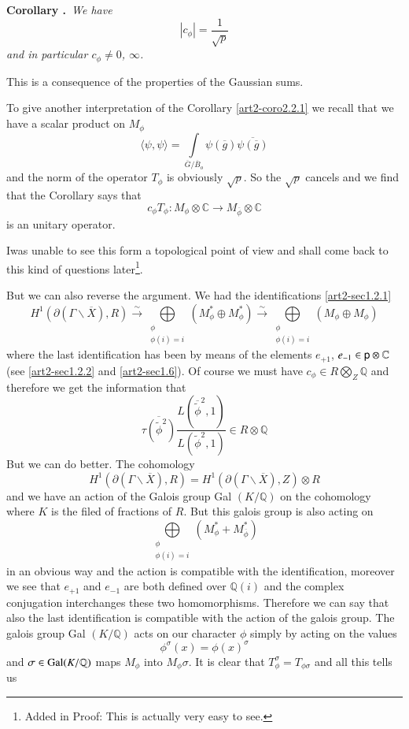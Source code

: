 \medskip
\noindent
{\bf Corollary .\label{art2-coro2.2.1}}~{\em We have}
$$
|c_{\phi}|=\frac{1}{\sqrt{p}}
$$
{\em and in particular $c_{\phi}\neq 0$, $\infty$.}
\smallskip

This is a consequence of the properties of the Gaussian sums.

To give another interpretation of the Corollary \ref{art2-coro2.2.1} we recall that we have a scalar product on $M_{\phi}$
$$
\langle \psi,\psi\rangle = \int\limits_{\overline{G}/\overline{B}_{o}}\psi(\overline{g})\overline{\psi(\overline{g})}
$$
and the norm of the operator $T_{\phi}$ is obviously $\sqrt{p}$. So the $\sqrt{p}$ cancels and we find that the Corollary says that
$$
c_{\phi}T_{\phi}:M_{\phi}\otimes \mathbb{C}\to M_{\overline{\phi}}\otimes \mathbb{C}
$$
is an unitary operator.

I\pageoriginale was unable to see this form a topological point of view and shall come back to this kind of questions later\footnote[1]{Added in Proof: This is actually very easy to see.}.

But we can also reverse the argument. We had the identifications \eqref{art2-sec1.2.1}
$$
H^{1}(\partial(\Gamma\backslash \overline{X}),R)\xrightarrow{\sim}\bigoplus\limits_{\substack{\phi\\ \phi(i)=i}}(M^{*}_{\phi}\oplus M^{*}_{\phi})\xrightarrow{\sim}\bigoplus\limits_{\substack{\phi\\ \phi(i)=i}}(M_{\phi}\oplus M_{\phi})
$$
where the last identification has been by means of the elements $e_{+1}$, $e_{-1}\in \mathsf{p} \otimes \mathbb{C}$ (see \ref{art2-sec1.2.2} and \ref{art2-sec1.6}). Of course we must have $c_{\phi}\in R\bigotimes\limits_{Z}\mathbb{Q}$ and therefore we get the information that
$$
\overline{\tau(\widetilde{\phi}^{2})}\frac{L(\overline{\widetilde{\phi}}^{2},1)}{L(\widetilde{\phi}^{2},1)}\in R\otimes \mathbb{Q}
$$
But we can do better. The cohomology
$$
H^{1}(\partial (\Gamma\backslash\overline{X}),R)=H^{1}(\partial(\Gamma\backslash\overline{X}),Z)\otimes R
$$
and we have an action of the Galois group Gal $(K/\mathbb{Q})$ on the cohomology where $K$ is the filed of fractions of $R$. But this galois group is also acting on 
$$
\bigoplus\limits_{\substack{\phi\\ \phi(i)=i}}(M^{*}_{\phi}+M^{*}_{\overline{\phi}})
$$
in an obvious way and the action is compatible with the identification, moreover we see that $e_{+1}$ and $e_{-1}$ are both defined over $\mathbb{Q}(i)$ and the complex conjugation interchanges these two homomorphisms. Therefore we can say that also the last identification is compatible with the action of the galois group. The galois group Gal $(K/\mathbb{Q})$ acts on our character $\phi$ simply by acting on the values
$$
\phi^{\sigma}(x)=\phi(x)^{\sigma}
$$
and $\sigma\in \operatorname{Gal}(K/\mathbb{Q})$ maps $M_{\phi}$ into $M_{\phi}\sigma$. It is clear that $T^{\sigma}_{\phi}=T_{\phi\sigma}$ and all this tells us

